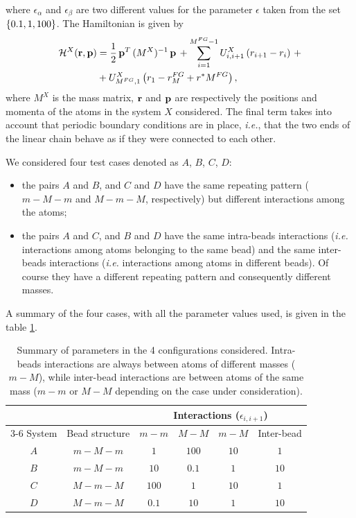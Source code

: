 \documentclass[10pt,a4paper]{book}
\theoremstyle{definition}
\begin{document}
where $\epsilon_\alpha$ and $\epsilon_\beta$ are two different values for the parameter $\epsilon$ taken from the set $\left\lbrace 0.1,1,100\right\rbrace$.
The Hamiltonian is given by
\begin{equation}
 \begin{split}
  	\mathcal{H}^X(\mathbf{r},\mathbf{p}) &= \frac12 \, \mathbf{p}^T\,(M^X)^{-1}\,\mathbf{p}\,+\sum_{i=1}^{M^{FG}-1}U^X_{i,i+1}\left(r_{i+1}-r_i\right)\,+ \\
	&+ U^X_{M^{FG},1}\left(r_1-r_M^{FG}+r^*M^{FG}\right),
 \end{split}
 \label{eq:1DHamiltonian}
\end{equation}
where $M^X$ is the mass matrix, $\mathbf{r}$ and $\mathbf{p}$ are respectively the positions and momenta of the atoms in the system $X$ considered. 
The final term takes into account that periodic boundary conditions are in place, \textit{i.e.}, that the two ends of the linear chain behave as if they were connected to each other.

We considered four test cases denoted as $A$, $B$, $C$, $D$:
\begin{itemize}
 \item the pairs $A$ and $B$, and $C$ and $D$ have the same repeating pattern  ($m-M-m$ and $M-m-M$, respectively) but different interactions among the atoms;
 \item the pairs $A$ and $C$, and $B$ and $D$ have the same intra-beads interactions (\textit{i.e.} interactions among atoms belonging to the same bead) and the same inter-beads interactions (\textit{i.e.} interactions among atoms in different beads). Of course they have a different repeating pattern and consequently different masses.
\end{itemize}
A summary of the four cases, with all the parameter values used, is given in the table \ref{Tab:Cases}.
\begin{table}[htb]
 \centering
 \begin{tabular}{c c c c c c} 
  \toprule[1.1pt]
   &  & \multicolumn{4}{c}{Interactions ($\epsilon_{i,i+1}$)} \\
  \cmidrule(l){3-6}
  System & Bead structure & $m-m$ & $M-M$ & $m-M$ & Inter-bead \\
  \midrule
  $A$ & $m-M-m$ & $1$ & $100$ & $10$ & $1$ \\ 
  $B$ & $m-M-m$ & $10$ & $0.1$ & $1$  & $10$ \\  
  $C$ & $M-m-M$ & $100$ & $1$ & $10$ & $1$ \\
  $D$ & $M-m-M$ & $0.1$ & $10$ & $1$ & $10$ \\
  \bottomrule[1.1pt]
 \end{tabular}
 \caption{Summary of parameters in the 4 configurations considered. Intra-beads interactions are always between atoms of different masses ($m-M$), while inter-bead interactions are between atoms of the same mass ($m-m$ or $M-M$ depending on the case under consideration).}
 \label{Tab:Cases}
\end{table}
\end{document}
